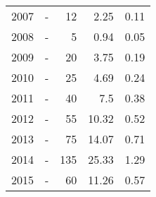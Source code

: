 \begin{longtable}{lXrrr}
        2007 & \multicolumn{1}{X}{-} & %
          \num{12} &
          \num[round-mode=places,round-precision=2]{2.25} &
          \num[round-mode=places,round-precision=2]{0.11} \\

        2008 & \multicolumn{1}{X}{-} & %
          \num{5} &
          \num[round-mode=places,round-precision=2]{0.94} &
          \num[round-mode=places,round-precision=2]{0.05} \\

        2009 & \multicolumn{1}{X}{-} & %
          \num{20} &
          \num[round-mode=places,round-precision=2]{3.75} &
          \num[round-mode=places,round-precision=2]{0.19} \\

        2010 & \multicolumn{1}{X}{-} & %
          \num{25} &
          \num[round-mode=places,round-precision=2]{4.69} &
          \num[round-mode=places,round-precision=2]{0.24} \\

        2011 & \multicolumn{1}{X}{-} & %
          \num{40} &
          \num[round-mode=places,round-precision=2]{7.5} &
          \num[round-mode=places,round-precision=2]{0.38} \\

        2012 & \multicolumn{1}{X}{-} & %
          \num{55} &
          \num[round-mode=places,round-precision=2]{10.32} &
          \num[round-mode=places,round-precision=2]{0.52} \\

        2013 & \multicolumn{1}{X}{-} & %
          \num{75} &
          \num[round-mode=places,round-precision=2]{14.07} &
          \num[round-mode=places,round-precision=2]{0.71} \\

        2014 & \multicolumn{1}{X}{-} & %
          \num{135} &
          \num[round-mode=places,round-precision=2]{25.33} &
          \num[round-mode=places,round-precision=2]{1.29} \\

        2015 & \multicolumn{1}{X}{-} & %
          \num{60} &
          \num[round-mode=places,round-precision=2]{11.26} &
          \num[round-mode=places,round-precision=2]{0.57} \\


\end{longtable}
